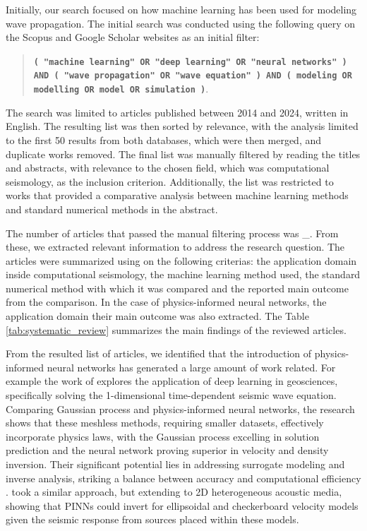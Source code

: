 \documentclass[11pt,twoside]{article}
\begin{document}
Initially, our search focused on how machine learning has been used for modeling wave propagation. The initial 
search was conducted using the following query on the Scopus and Google Scholar websites as an initial filter: 

\begin{quote}
\noindent\textbf{\texttt{( "machine learning" OR "deep learning" OR "neural networks" ) AND ( "wave propagation" 
OR "wave equation" ) AND ( modeling OR modelling OR model OR simulation )}}.
\end{quote}

The search was limited to articles published between 2014 and 2024, written in English. The resulting list was then 
sorted by relevance, with the analysis limited to the first 50 results from both 
databases, which were then merged, and duplicate works removed. The final list was manually filtered by 
reading the titles and abstracts, with relevance to the chosen field, which was computational seismology, 
as the inclusion criterion. Additionally, the list was restricted to works that provided a comparative 
analysis between machine learning methods and standard numerical methods in the abstract. 

The number of articles that passed the manual filtering process was \_. From these, we extracted relevant information to 
address the research question. The articles were summarized using on the following criterias: the application domain 
inside computational seismology, the machine learning method used, the standard numerical method with which it was 
compared and the reported main outcome from the comparison. In the case of physics-informed neural networks, 
the application domain their main outcome was also extracted. The Table \ref{tab:systematic_review} summarizes 
the main findings of the reviewed articles. 

From the resulted list of articles, we identified that the introduction of physics-informed neural 
networks has generated a large amount of work related. For example the work of 
 explores the application of deep learning in geosciences, 
specifically solving the 1-dimensional time-dependent seismic wave equation. Comparing Gaussian process 
and physics-informed neural networks, the research shows that these meshless methods, requiring 
smaller datasets, effectively incorporate physics laws, with the Gaussian process excelling in 
solution prediction and the neural network proving superior in velocity and density inversion. 
Their significant potential lies in addressing surrogate modeling and inverse analysis, 
striking a balance between accuracy and computational efficiency \citep{Song2022}. 
 took a similar  approach, but extending to 2D heterogeneous acoustic 
media, showing that PINNs could invert for ellipsoidal and checkerboard velocity models 
given the seismic response from sources placed within these models.
\end{document}
